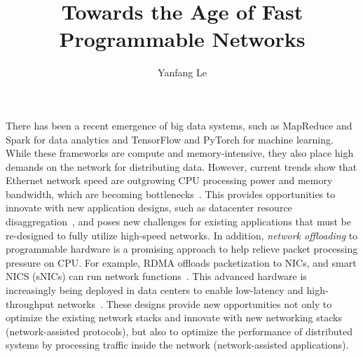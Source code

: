 \documentclass[10pt]{article}
\title{Towards the Age of Fast Programmable Networks}
\author{Yanfang Le}
\date{}
\begin{document}
\maketitle
\vspace{-5mm}
There has been a recent emergence of big data systems, such as MapReduce and Spark for data analytics and TensorFlow and PyTorch for machine learning.
While these frameworks are compute and memory-intensive, they also place high demands on the network for distributing data. 
However, current trends show that Ethernet network speed are outgrowing CPU processing power and memory bandwidth, which are becoming  bottlenecks~\cite{CPU:bandwidth,DRAM:scaling}. 
This provides opportunities to innovate with new application designs, such as datacenter resource disaggregation~\cite{aggregation:gao}, and poses new challenges for existing applications that must be re-designed to fully utilize high-speed networks. In addition, {\em network offloading} to programmable hardware is a 
promising approach to help relieve packet processing pressure on CPU. For example, RDMA offloads packetization to NICs, and smart NICS (sNICs) can run network functions~\cite{uno:le}.
This advanced hardware is increasingly being deployed in data centers %
to enable low-latency and high-throughput networks~\cite{Guo:2016:ROC, Firestone:2018:AAN, brainwave}.
These designs provide new opportunities not only to optimize the existing network stacks and innovate with 
new networking stacks (network-assisted protocols), 
but also to optimize the performance of distributed systems by processing traffic inside the network (network-assisted applications).
\end{document}

